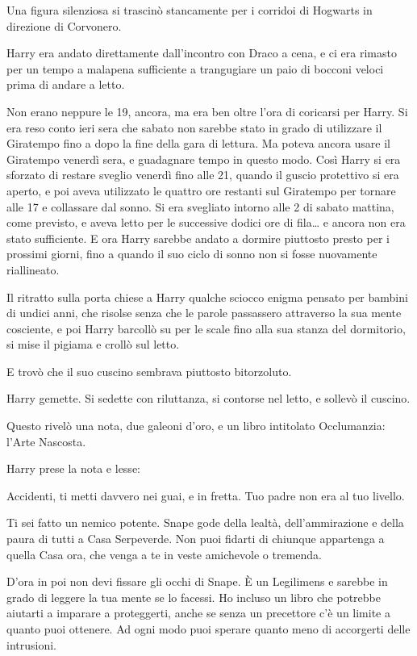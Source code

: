 Una figura silenziosa si trascinò stancamente per i corridoi di Hogwarts in direzione di Corvonero.

Harry era andato direttamente dall’incontro con Draco a cena, e ci era rimasto per un tempo a malapena sufficiente a trangugiare un paio di bocconi veloci prima di andare a letto.

Non erano neppure le 19, ancora, ma era ben oltre l’ora di coricarsi per Harry. Si era reso conto ieri sera che sabato non sarebbe stato in grado di utilizzare il Giratempo fino a dopo la fine della gara di lettura. Ma poteva ancora usare il Giratempo venerdì sera, e guadagnare tempo in questo modo. Così Harry si era sforzato di restare sveglio venerdì fino alle 21, quando il guscio protettivo si era aperto, e poi aveva utilizzato le quattro ore restanti sul Giratempo per tornare alle 17 e collassare dal sonno. Si era svegliato intorno alle 2 di sabato mattina, come previsto, e aveva letto per le successive dodici ore di fila… e ancora non era stato sufficiente. E ora Harry sarebbe andato a dormire piuttosto presto per i prossimi giorni, fino a quando il suo ciclo di sonno non si fosse nuovamente riallineato.

Il ritratto sulla porta chiese a Harry qualche sciocco enigma pensato per bambini di undici anni, che risolse senza che le parole passassero attraverso la sua mente cosciente, e poi Harry barcollò su per le scale fino alla sua stanza del dormitorio, si mise il pigiama e crollò sul letto.

E trovò che il suo cuscino sembrava piuttosto bitorzoluto.

Harry gemette. Si sedette con riluttanza, si contorse nel letto, e sollevò il cuscino.

Questo rivelò una nota, due galeoni d’oro, e un libro intitolato Occlumanzia: l’Arte Nascosta.

Harry prese la nota e lesse:

Accidenti, ti metti davvero nei guai, e in fretta. Tuo padre non era al tuo livello.

Ti sei fatto un nemico potente. Snape gode della lealtà, dell’ammirazione e della paura di tutti a Casa Serpeverde. Non puoi fidarti di chiunque appartenga a quella Casa ora, che venga a te in veste amichevole o tremenda.

D’ora in poi non devi fissare gli occhi di Snape. È un Legilimens e sarebbe in grado di leggere la tua mente se lo facessi. Ho incluso un libro che potrebbe aiutarti a imparare a proteggerti, anche se senza un precettore c’è un limite a quanto puoi ottenere. Ad ogni modo puoi sperare quanto meno di accorgerti delle intrusioni.

